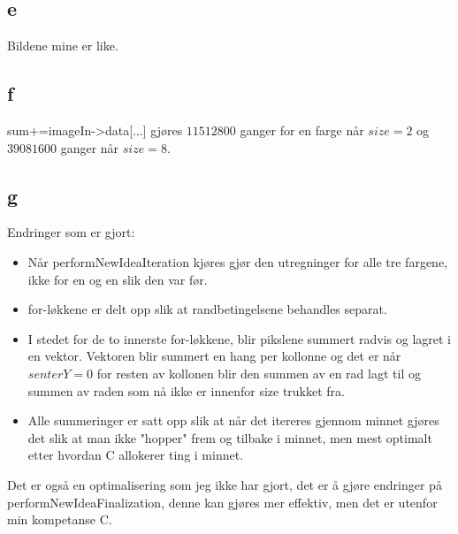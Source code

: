 \documentclass[12pt, a4paper]{article} %
\begin{document}
\subsection*{e}
Bildene mine er like.

\subsection*{f}
sum+=imageIn->data[...] gjøres $11512800 $ ganger for en farge når $size=2$ og $39081600 $ ganger når $size=8$.

\subsection*{g}
Endringer som er gjort:
\begin{itemize}
\item Når performNewIdeaIteration kjøres gjør den utregninger for alle tre fargene, ikke for en og en slik den var før.
\item for-løkkene er delt opp slik at randbetingelsene behandles separat.
\item I stedet for de to innerste for-løkkene, blir pikslene summert radvis og lagret i en vektor. Vektoren blir summert en hang per kollonne og det er når $senterY=0$ for resten av kollonen blir den summen av en rad lagt til og summen av raden som nå ikke er innenfor size trukket fra. 
\item Alle summeringer er satt opp slik at når det itereres gjennom minnet gjøres det slik at man ikke "hopper" frem og tilbake i minnet, men mest optimalt etter hvordan C allokerer ting i minnet. 
\end{itemize}

Det er også en optimalisering som jeg ikke har gjort, det er å gjøre endringer på performNewIdeaFinalization, denne kan gjøres mer effektiv, men det er utenfor min kompetanse  C.
\end{document}
